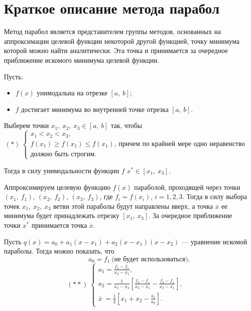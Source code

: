 \documentclass{bmstu}
\begin{document}
\section{Краткое описание метода парабол}

Метод парабол является представителем группы методов, основанных на аппроксимации целевой функции некоторой другой функцией, точку минимума которой можно найти аналитически. Эта точка и принимается за очередное приближение искомого минимума целевой функции.

Пусть:
\begin{itemize}
    \item $f(x)$ унимодальна на отрезке $[a, \ b]$;
    \item $f$ достигает минимума во внутренней точке отрезка $[a, \ b]$.
\end{itemize}

Выберем точки $x_1, \ x_2, \ x_3 \in [a, \ b]$ так, чтобы
\begin{equation}
    (*) \ 
    \begin{cases}
        x_1 < x_2 < x_3, \\
        f(x_1) \geqslant f(x_1) \leqslant f(x_1), \ \text{причем по крайней мере одно неравенство} \\
        \text{должно быть строгим}.
    \end{cases}
\end{equation}

Тогда в силу унимодальности функции $f$ $x^* \in [x_1, \ x_3]$.

Аппроксимируем целевую функцию $f(x)$ параболой, проходящей через точки $(x_1, \ f_1)$,  $(x_2, \ f_2)$,  $(x_3, \ f_3)$, где $f_i = f(x_i)$, $i = 1, 2, 3$.
Тогда в силу выбора точек $x_1, \ x_2, \ x_3$ ветви этой параболы будут направлены вверх, а точка $\overline{x}$ ее минимума будет принадлежать отрезку $[x_1, \ x_3]$. За очередное приближение точки $x^*$ принимается точка $\overline{x}$.

Пусть $q(x) = a_0 + a_1(x - x_1) +  a_2(x - x_1)(x - x_2)$ --- уравнение искомой параболы. Тогда можно показать, что 
\begin{equation*}
    \ \ \ \ \ \ \ \ \ \ \ \ \ \ \ \ \ \ a_0 = f_1 \ \text{(не будет использоваться)},
\end{equation*}
\begin{equation}
    (**) \ 
    \begin{cases}
        a_1 = \frac{f_2 - f_1}{x_2 - x_1}, \\
        a_2 = \frac{1}{x_3 - x_2} \left[ \frac{f_3 - f_1}{x_3 - x_1} - \frac{f_2 - f_1}{x_2 - x_1} \right], \\
        \overline{x} \ = \frac{1}{2} \left[ x_1 + x_2 - \frac{a_1}{a_2} \right].
    \end{cases}
\end{equation}
\end{document}
